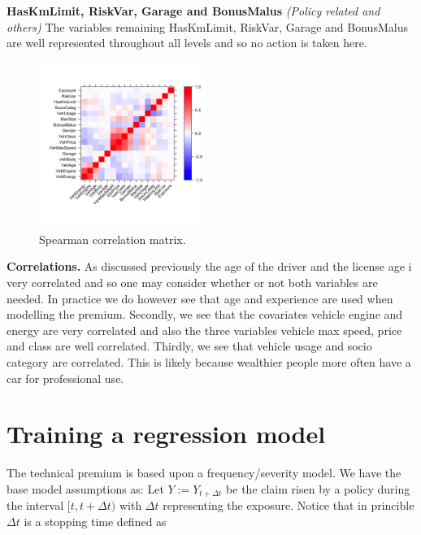 \documentclass[
]{article}
\begin{document}
\textbf{HasKmLimit, RiskVar, Garage and BonusMalus} \emph{(Policy
related and others)} The variables remaining HasKmLimit, RiskVar, Garage
and BonusMalus are well represented throughout all levels and so no
action is taken here.

\begin{figure}[h]
  \begin{center}
    \includegraphics[width=0.48\textwidth]{figures/plot8.png}
  \end{center}
  \caption{Spearman correlation matrix.}
\end{figure}

\textbf{Correlations.} As discussed previously the age of the driver and
the license age i very correlated and so one may consider whether or not
both variables are needed. In practice we do however see that age and
experience are used when modelling the premium. Secondly, we see that
the covariates vehicle engine and energy are very correlated and also
the three variables vehicle max speed, price and class are well
correlated. Thirdly, we see that vehicle usage and socio category are
correlated. This is likely because wealthier people more often have a
car for professional use.

\newpage

\hypertarget{training-a-regression-model}{%
\section{Training a regression
model}\label{training-a-regression-model}}

The technical premium is based upon a frequency/severity model. We have
the base model assumptions as: Let \(Y:=Y_{t+\Delta t}\) be the claim
risen by a policy during the interval \([t,t+\Delta t)\) with
\(\Delta t\) representing the exposure. Notice that in princible
\(\Delta t\) is a stopping time defined as
\end{document}
